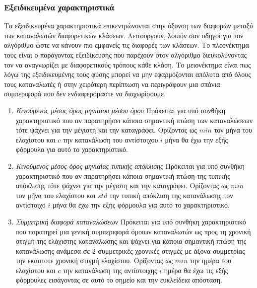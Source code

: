\subsubsection{Εξειδικευμένα χαρακτηριστικά}
Τα εξειδικευμένα χαρακτηριστικά επικεντρώνονται στην όξυνση των διαφορών μεταξύ των καταναλωτών διαφορετικών κλάσεων. Λειτουργούν, λοιπόν σαν οδηγοί για τον αλγόριθμο ώστε να κάνουν πιο εμφανείς τις διαφορές των κλάσεων. Το πλεονέκτημα τους είναι ο παράγοντας εξειδίκευσης που παρέχουν στον αλγόριθμο διευκολύνοντας τον να αναγνωρίζει με διαφορετικούς τρόπους κάθε κλάση. Το μειονέκτημα είναι πως λόγω της εξειδικευμένης τους φύσης μπορεί να μην εφαρμόζονται απόλυτα από όλους τους καταναλωτές ή στην χειρότερη περίπτωση να περιγράφουν μια σπάνια συμπεριφορά που δεν ενδιαφερόμαστε να διαχωρίσουμε.
\begin{enumerate}
\item{\textit{Κινούμενος μέσος όρος μηνιαίου μέσου όρου}} Πρόκειται για υπό συνθήκη χαρακτηριστικό που αν παρατηρήσει κάποια σημαντική πτώση των καταναλώσεων τότε ψάχνει για την μέγιστη και την καταγράφει. Ορίζοντας ως $min$ τον μήνα του ελαχίστου και $c$ την κατανάλωση του αντίστοιχου $i$ μήνα θα έχω την εξής φόρμουλα για αυτό το χαρακτηριστικό. 
\begin{center}
\end{center}
\item{\textit{Κινούμενος μέσος όρος μηνιαίας τυπικής απόκλισης}} Πρόκειται για υπό συνθήκη χαρακτηριστικό που αν παρατηρήσει κάποια σημαντική πτώση της τυπικής απόκλισης τότε ψάχνει για την μέγιστη και την καταγράφει. Ορίζοντας ως $min$ τον μήνα του ελαχίστου και $std$ την τυπική απόκλιση της κατανάλωσης τον αντίστοιχο $i$ μήνα θα έχω την εξής φόρμουλα για αυτό το χαρακτηριστικό. 
\begin{center}
\end{center}
\item{\textit{Συμμετρική διαφορά καταναλώσεων}} Πρόκειται για υπό συνθήκη χαρακτηριστικό που παρατηρεί μια γενική συμπεριφορά όμοιων καταναλωτών ως προς τη χρονική στιγμή της ελάχιστης κατανάλωσης και ψάχνει για κάποια σημαντική πτώση της κατανάλωσης ανάμεσα σε 2 συμμετρικές χρονικές στιγμές με άξονα συμμετρίας την εκάστοτε χρονική στιγμή ελαχίστου. Ορίζοντας ως $min$ την ημέρα του ελαχίστου και $c$ την κατανάλωση της αντίστοιχης $i$ ημέρα θα έχω τις εξής φόρμουλες εισάγοντας σε αυτό το σημείο και την ευκλείδεια απόσταση.

\end{enumerate}
